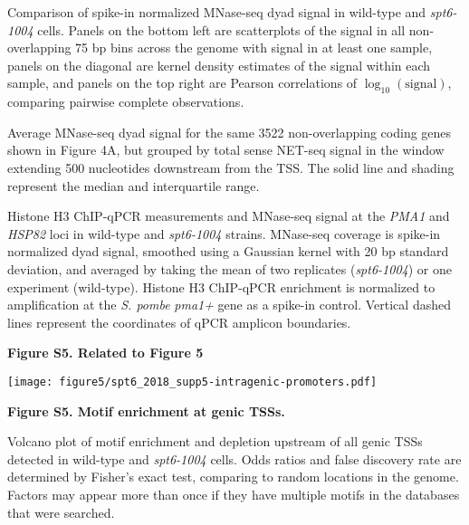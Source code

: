 \documentclass[9pt, letterpaper]{extarticle}
\begin{document}
\begin{description}[noitemsep, topsep=0pt, align=right, labelwidth=12pt, itemindent=0pt, leftmargin=0pt]
	\item [\textbf{(A)}] Comparison of spike-in normalized MNase-seq dyad signal in wild-type and \textit{spt6-1004} cells. Panels on the bottom left are scatterplots of the signal in all non-overlapping 75 bp bins across the genome with signal in at least one sample, panels on the diagonal are kernel density estimates of the signal within each sample, and panels on the top right are Pearson correlations of $\log_{10}\left(\text{signal} \right)$, comparing pairwise complete observations.
	\item [\textbf{(B)}] Average MNase-seq dyad signal for the same 3522 non-overlapping coding genes shown in Figure 4A, but grouped by total sense NET-seq signal in the window extending 500 nucleotides downstream from the TSS. The solid line and shading represent the median and interquartile range.
	\item [\textbf{(C)}] Histone H3 ChIP-qPCR measurements and MNase-seq signal at the \textit{PMA1} and \textit{HSP82} loci in wild-type and \textit{spt6-1004} strains. MNase-seq coverage is spike-in normalized dyad signal, smoothed using a Gaussian kernel with 20 bp standard deviation, and averaged by taking the mean of two replicates (\textit{spt6-1004}) or one experiment (wild-type). Histone H3 ChIP-qPCR enrichment is normalized to amplification at the \textit{S. pombe} \textit{pma1+} gene as a spike-in control. Vertical dashed lines represent the coordinates of qPCR amplicon boundaries.
\end{description}

\newpage
\textbf{\large Figure S5. Related to Figure 5}

{\centering \texttt{[image: figure5/spt6\_2018\_supp5-intragenic-promoters.pdf]}\par}

\textbf{Figure S5. Motif enrichment at genic TSSs.}

\begin{description}[noitemsep, topsep=0pt, align=right, labelwidth=12pt, itemindent=0pt, leftmargin=0pt]
    \item [\textbf{(A)}] Volcano plot of motif enrichment and depletion upstream of all genic TSSs detected in wild-type and \textit{spt6-1004} cells. Odds ratios and false discovery rate are determined by Fisher's exact test, comparing to random locations in the genome. Factors may appear more than once if they have multiple motifs in the databases that were searched.
\end{description}
\end{document}
